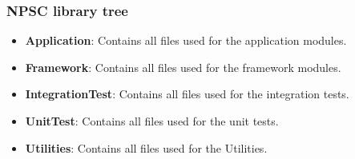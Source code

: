 \subsubsection{NPSC library tree}
\begin{itemize}
	\item \textbf{Application}: Contains all files used for the application modules.
	\item \textbf{Framework}: Contains all files used for the framework modules.
	\item \textbf{IntegrationTest}: Contains all files used for the integration tests.
	\item \textbf{UnitTest}: Contains all files used for the unit tests.
	\item \textbf{Utilities}: Contains all files used for the Utilities.
\end{itemize}